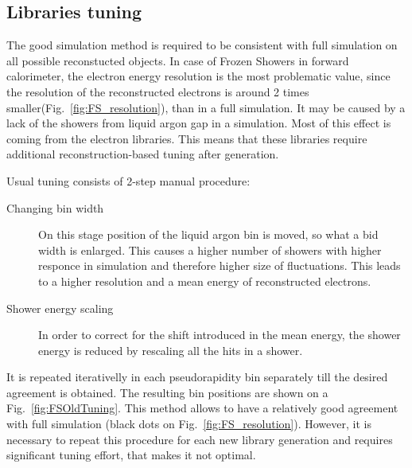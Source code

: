 \begin{figure}[!tbp]
\end{figure}

\subsection{Libraries tuning}\label{sec:LibTuning}

The good simulation method is required to be consistent with full simulation on all possible reconstucted objects. In case of Frozen Showers in forward calorimeter, the electron energy resolution is the most problematic value, since the resolution of the reconstructed electrons is around 2 times smaller(Fig.~\ref{fig:FS_resolution}), than in a full simulation. It may be caused by a lack of the showers from liquid argon gap in a simulation. Most of this effect is coming from the electron libraries. This means that these libraries require additional reconstruction-based tuning after generation.

Usual tuning consists of 2-step manual procedure:
\begin{description}
\item [Changing bin width] On this stage position of the liquid argon bin is moved, so what a bid width is enlarged. This causes a higher number of showers with higher responce in simulation and therefore higher size of fluctuations. This leads to a higher resolution and a mean energy of reconstructed electrons.
\item [Shower energy scaling] In order to correct for the shift introduced  in the mean energy, the shower energy is reduced by rescaling all the hits in a shower.
\end{description}
 It is repeated iterativelly in each pseudorapidity bin separately till the desired agreement is obtained. The resulting bin positions are shown on a Fig.~\ref{fig:FSOldTuning}. This method allows to have a relatively good agreement with full simulation (black dots on Fig.~\ref{fig:FS_resolution}). However, it is necessary to repeat this procedure for each new library generation and requires significant tuning effort, that makes it not optimal. 

